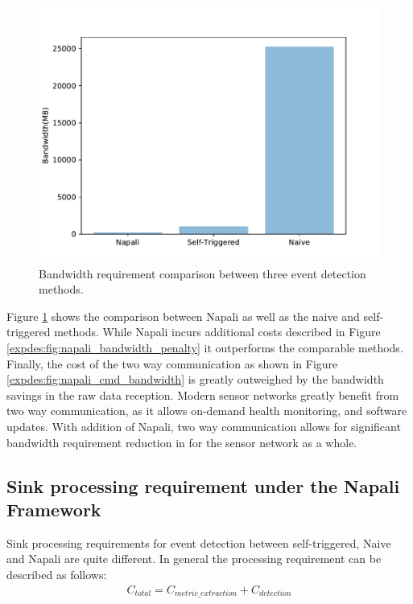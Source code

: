 \begin{figure}[h]
    \centering
    \includegraphics[width=0.8\linewidth]{img/napali_eval/napali_bandwidth_comparison.pdf}
    \caption{Bandwidth requirement comparison between three event detection methods.}
    \label{expdes:fig:bandwidth_master_comparison}
\end{figure}

Figure \ref{expdes:fig:bandwidth_master_comparison} shows the comparison between Napali as well as the naive and self-triggered methods.
While Napali incurs additional costs described in Figure \ref{expdes:fig:napali_bandwidth_penalty} it outperforms the comparable methods.
Finally, the cost of the two way communication as shown in Figure \ref{expdes:fig:napali_cmd_bandwidth} is greatly outweighed by the bandwidth savings in the raw data reception.
Modern sensor networks greatly benefit from two way communication, as it allows on-demand health monitoring, and software updates.
With addition of Napali, two way communication allows for significant bandwidth requirement reduction in for the sensor network as a whole.

\subsection{Sink processing requirement under the Napali Framework} \label{iexp:sec:scale}
Sink processing requirements for event detection between self-triggered, Naive and Napali are quite different.
In general the processing requirement can be described as follows:
\begin{equation}\label{eq:detection_cost}
\begin{aligned}
    C_{total} = C_{metric\_extraction} + C_{detection}
\end{aligned}
\end{equation}

